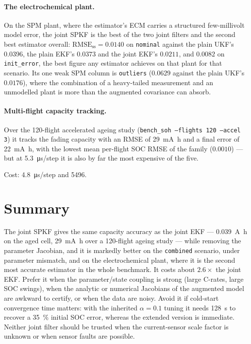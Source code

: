 \paragraph{The electrochemical plant.}  On the SPM plant, where the estimator's ECM carries a
structured few-millivolt model error, the joint SPKF is the best of the two joint filters and the
second best estimator overall: $\text{RMSE}_\text{ss}=0.0140$ on \texttt{nominal} against the plain
UKF's $0.0396$, the plain EKF's $0.0373$ and the joint EKF's $0.0211$, and $0.0082$ on
\texttt{init\_error}, the best figure any estimator achieves on that plant for that scenario.  Its
one weak SPM column is \texttt{outliers} ($0.0629$ against the plain UKF's $0.0176$), where the
combination of a heavy-tailed measurement and an unmodelled plant is more than the augmented
covariance can absorb.

\paragraph{Multi-flight capacity tracking.}  Over the 120-flight accelerated ageing study
(\texttt{bench\_soh --flights 120 --accel 3}) it tracks the fading capacity with an RMSE of
\SI{29}{\milli\ampere\hour} and a final error of \SI{+22}{\milli\ampere\hour}, with the lowest mean
per-flight SOC RMSE of the family ($0.0010$) --- but at \SI{5.3}{\micro\second}/step it is also by
far the most expensive of the five.

Cost: \SI{4.8}{\micro\second}/step and \SI{5496}{\byte}.

\section{Summary}
The joint SPKF gives the same capacity accuracy as the joint EKF --- \SI{0.039}{\ampere\hour} on
the aged cell, \SI{29}{\milli\ampere\hour} over a 120-flight ageing study --- while removing the
parameter Jacobian, and it is markedly better on the \texttt{combined} scenario, under parameter
mismatch, and on the electrochemical plant, where it is the second most accurate estimator in the
whole benchmark.  It costs about $2.6\times$ the joint EKF.  Prefer it when the parameter/state coupling is strong (large
C-rates, large SOC swings), when the analytic or numerical Jacobians of the augmented model are
awkward to certify, or when the data are noisy.  Avoid it if cold-start convergence time matters:
with the inherited $\alpha=0.1$ tuning it needs \SI{128}{\second} to recover a \SI{35}{\percent}
initial SOC error, whereas the extended version is immediate.  Neither joint filter should be
trusted when the current-sensor scale factor is unknown or when sensor faults are possible.
